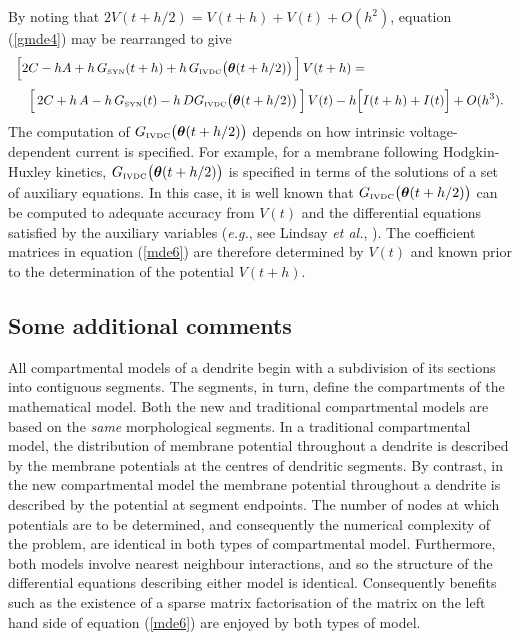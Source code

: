 By noting that $2V(t+h/2)=V(t+h)+V(t)+O(h^2)$, equation
(\ref{gmde4}) may be rearranged to give
\begin{equation}\label{mde6}
\begin{array}{l}
\displaystyle\Big[2C-hA+h\,G_{\mbox{\tiny SYN}}(t+h)
+h\,G_{\mbox{\tiny IVDC}}\big(\boldsymbol{\theta}(t+h/2)\big)\,\Big]\,V(t+h) =
\\[10pt] \quad\displaystyle\Big[\,2C+h\,A-h\,G_{\mbox{\tiny SYN}}(t)
-h\,DG_{\mbox{\tiny IVDC}}\big(\boldsymbol{\theta}(t+h/2)\big)\,\Big]\,V(t)
-h\Big[I(t+h)+I(t)\Big]+O(h^3).
\end{array}
\end{equation}
The computation of $G_{\mbox{\tiny IVDC}}\big(\boldsymbol{\theta}(t+h/2)\big)$
depends on how intrinsic voltage-dependent current is specified.
For example, for a membrane following Hodgkin-Huxley kinetics,
$G_{\mbox{\tiny IVDC}}\big(\boldsymbol{\theta}(t+h/2)\big)$ is specified in
terms of the solutions of a set of auxiliary equations. In this
case, it is well known that
$G_{\mbox{\tiny IVDC}}\big(\boldsymbol{\theta}(t+h/2)\big)$ can be computed to
adequate accuracy from $V(t)$ and the differential equations
satisfied by the auxiliary variables (\emph{e.g.}, see Lindsay
\emph{et al.}, \cite{Lindsay01a}). The coefficient matrices in
equation (\ref{mde6}) are therefore determined by $V(t)$ and known
prior to the determination of the potential $V(t+h)$.

\subsection{Some additional comments}
All compartmental models of a dendrite begin with a subdivision of
its sections into contiguous segments. The segments, in turn,
define the compartments of the mathematical model. Both the new
and traditional compartmental models are based on the \emph{same}
morphological segments. In a traditional compartmental model, the
distribution of membrane potential throughout a dendrite is
described by the membrane potentials at the centres of dendritic
segments. By contrast, in the new compartmental model the membrane
potential throughout a dendrite is described by the potential at
segment endpoints. The number of nodes at which potentials are to
be determined, and consequently the numerical complexity of the
problem, are identical in both types of compartmental model.
Furthermore, both models involve nearest neighbour interactions,
and so the structure of the differential equations describing
either model is identical. Consequently benefits such as the
existence of a sparse matrix factorisation of the matrix on the
left hand side of equation (\ref{mde6}) are enjoyed by both types
of model.

